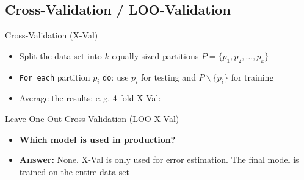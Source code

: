 \subsection{Cross-Validation / LOO-Validation}

\begin{frame}{Cross-Validation (X-Val)}{}\important
	\begin{itemize}
		\item Split the data set into $k$ equally sized partitions $P = \{ p_1, p_2, \dots, p_k \}$
		\item \texttt{For each} partition $p_i$ \texttt{do}: use $p_i$ for testing and $P \backslash \{ p_i \}$ for training
		\item Average the results; e.\,g. 4-fold X-Val:
	\end{itemize}
	
	\vspace*{-5mm}
	
\end{frame}


\begin{frame}{Leave-One-Out Cross-Validation (LOO X-Val)}{}
	\vspace*{2mm}
	
	\vspace*{5mm}
	\begin{boxBlueNoFrame}
		
	\end{boxBlueNoFrame}
	
	\begin{itemize}
		\item \textbf{Which model is used in production?}
		\item \textbf{Answer:} None. X-Val is only used for error estimation. The final model is trained on the entire data set
	\end{itemize}
\end{frame}


